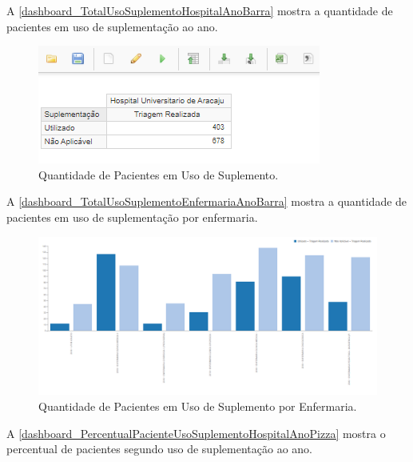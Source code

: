\newpage
A \autoref{dashboard_TotalUsoSuplementoHospitalAnoBarra} mostra a quantidade de pacientes em uso de suplementação ao ano.

\begin{figure}[htb]
	\caption{\label{dashboard_TotalUsoSuplementoHospitalAnoBarra}Quantidade de Pacientes em Uso de Suplemento.}
	\begin{center}
	    \includegraphics[scale=1]{Imagens/5.1.TotalUsoSuplementoHospitalAnoBarra.png}
	\end{center}
\end{figure}

A \autoref{dashboard_TotalUsoSuplementoEnfermariaAnoBarra} mostra a quantidade de pacientes em uso de suplementação por enfermaria.

\begin{figure}[htb]
	\caption{\label{dashboard_TotalUsoSuplementoEnfermariaAnoBarra}Quantidade de Pacientes em Uso de Suplemento por Enfermaria.}
	\begin{center}
	    \includegraphics[scale=0.55]{Imagens/5.2.TotalUsoSuplementoEnfermariaAnoBarra.png}
	\end{center}
\end{figure}

\newpage
A \autoref{dashboard_PercentualPacienteUsoSuplementoHospitalAnoPizza} mostra o percentual de pacientes segundo uso de suplementação ao ano.

